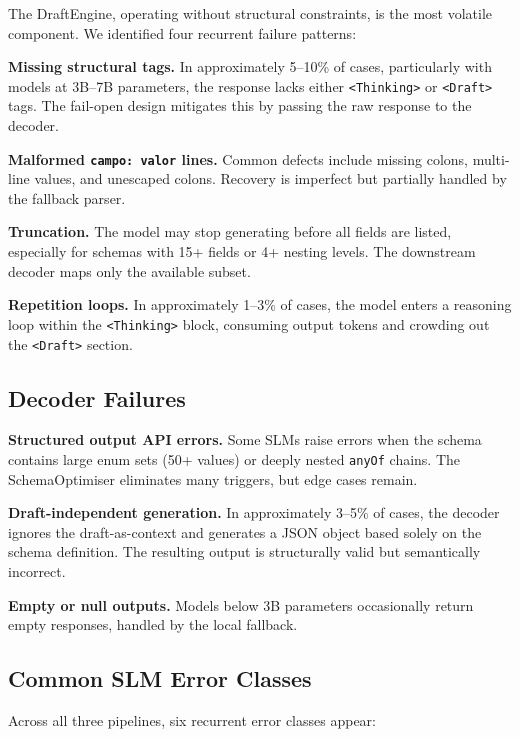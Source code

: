 \documentclass[onecolumn]{ceurart}
\begin{document}
The DraftEngine, operating without structural constraints, is the most volatile
component. We identified four recurrent failure patterns:

\textbf{Missing structural tags.} In approximately 5--10\% of cases,
particularly with models at 3B--7B parameters, the response lacks either
\texttt{<Thinking>} or \texttt{<Draft>} tags. The fail-open design mitigates
this by passing the raw response to the decoder.

\textbf{Malformed \texttt{campo: valor} lines.} Common defects include missing
colons, multi-line values, and unescaped colons. Recovery is imperfect but
partially handled by the fallback parser.

\textbf{Truncation.} The model may stop generating before all fields are listed,
especially for schemas with 15+ fields or 4+ nesting levels. The downstream
decoder maps only the available subset.

\textbf{Repetition loops.} In approximately 1--3\% of cases, the model enters a
reasoning loop within the \texttt{<Thinking>} block, consuming output tokens and
crowding out the \texttt{<Draft>} section.

\subsection{Decoder Failures}

\textbf{Structured output API errors.} Some SLMs raise errors when the schema
contains large enum sets (50+ values) or deeply nested \texttt{anyOf} chains.
The SchemaOptimiser eliminates many triggers, but edge cases remain.

\textbf{Draft-independent generation.} In approximately 3--5\% of cases, the
decoder ignores the draft-as-context and generates a JSON object based solely
on the schema definition. The resulting output is structurally valid but
semantically incorrect.

\textbf{Empty or null outputs.} Models below 3B parameters occasionally return
empty responses, handled by the local fallback.

\subsection{Common SLM Error Classes}

Across all three pipelines, six recurrent error classes appear:
\end{document}
